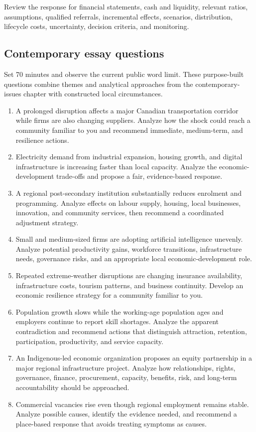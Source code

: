\documentclass[11pt,letterpaper,oneside,openany]{book}
\begin{document}
Review the response for financial statements, cash and liquidity, relevant ratios, assumptions, qualified referrals, incremental effects, scenarios, distribution, lifecycle costs, uncertainty, decision criteria, and monitoring.


\subsection[Contemporary essay questions]{Contemporary essay questions}
Set 70 minutes and observe the current public word limit. These purpose-built questions combine themes and analytical approaches from the contemporary-issues chapter with constructed local circumstances.


\begin{enumerate}
\item A prolonged disruption affects a major Canadian transportation corridor while firms are also changing suppliers. Analyze how the shock could reach a community familiar to you and recommend immediate, medium-term, and resilience actions.
\item Electricity demand from industrial expansion, housing growth, and digital infrastructure is increasing faster than local capacity. Analyze the economic-development trade-offs and propose a fair, evidence-based response.
\item A regional post-secondary institution substantially reduces enrolment and programming. Analyze effects on labour supply, housing, local businesses, innovation, and community services, then recommend a coordinated adjustment strategy.
\item Small and medium-sized firms are adopting artificial intelligence unevenly. Analyze potential productivity gains, workforce transitions, infrastructure needs, governance risks, and an appropriate local economic-development role.
\item Repeated extreme-weather disruptions are changing insurance availability, infrastructure costs, tourism patterns, and business continuity. Develop an economic resilience strategy for a community familiar to you.
\item Population growth slows while the working-age population ages and employers continue to report skill shortages. Analyze the apparent contradiction and recommend actions that distinguish attraction, retention, participation, productivity, and service capacity.
\item An Indigenous-led economic organization proposes an equity partnership in a major regional infrastructure project. Analyze how relationships, rights, governance, finance, procurement, capacity, benefits, risk, and long-term accountability should be approached.
\item Commercial vacancies rise even though regional employment remains stable. Analyze possible causes, identify the evidence needed, and recommend a place-based response that avoids treating symptoms as causes.
\end{enumerate}
\end{document}
